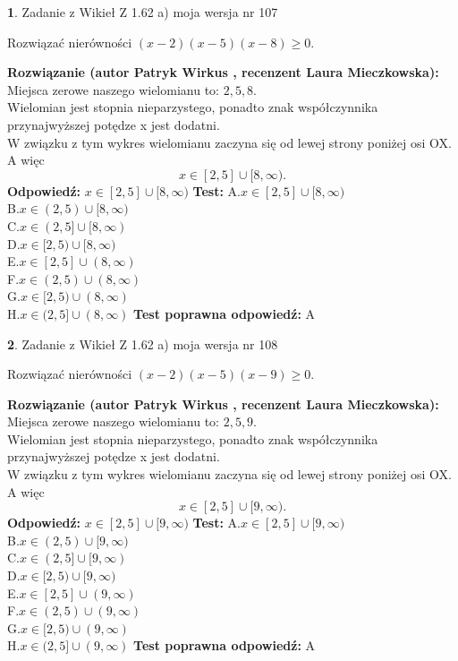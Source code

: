 \documentclass[12pt, a4paper]{article}
\theoremstyle{definition} %
\newtheorem{zad}{}
\newcommand{\zadStart}[1]{\begin{zad}#1\newline}
\newcommand{\zadStop}{\end{zad}}
\newcommand{\rozwStart}[2]{\noindent \textbf{Rozwiązanie (autor #1 , recenzent #2): }\newline}
\newcommand{\rozwStop}{\newline}
\newcommand{\odpStart}{\noindent \textbf{Odpowiedź:}\newline}
\newcommand{\odpStop}{\newline}
\newcommand{\testStart}{\noindent \textbf{Test:}\newline}
\newcommand{\testStop}{\newline}
\newcommand{\kluczStart}{\noindent \textbf{Test poprawna odpowiedź:}\newline}
\newcommand{\kluczStop}{\newline}
\begin{document}
\zadStart{Zadanie z Wikieł Z 1.62 a) moja wersja nr 107}

Rozwiązać nierówności $(x-2)(x-5)(x-8)\ge0$.
\zadStop
\rozwStart{Patryk Wirkus}{Laura Mieczkowska}
Miejsca zerowe naszego wielomianu to: $2, 5, 8$.\\
Wielomian jest stopnia nieparzystego, ponadto znak współczynnika przy\linebreak najwyższej potędze x jest dodatni.\\ W związku z tym wykres wielomianu zaczyna się od lewej strony poniżej osi OX. A więc $$x \in [2,5] \cup [8,\infty).$$
\rozwStop
\odpStart
$x \in [2,5] \cup [8,\infty)$
\odpStop
\testStart
A.$x \in [2,5] \cup [8,\infty)$\\
B.$x \in (2,5) \cup [8,\infty)$\\
C.$x \in (2,5] \cup [8,\infty)$\\
D.$x \in [2,5) \cup [8,\infty)$\\
E.$x \in [2,5] \cup (8,\infty)$\\
F.$x \in (2,5) \cup (8,\infty)$\\
G.$x \in [2,5) \cup (8,\infty)$\\
H.$x \in (2,5] \cup (8,\infty)$
\testStop
\kluczStart
A
\kluczStop



\zadStart{Zadanie z Wikieł Z 1.62 a) moja wersja nr 108}

Rozwiązać nierówności $(x-2)(x-5)(x-9)\ge0$.
\zadStop
\rozwStart{Patryk Wirkus}{Laura Mieczkowska}
Miejsca zerowe naszego wielomianu to: $2, 5, 9$.\\
Wielomian jest stopnia nieparzystego, ponadto znak współczynnika przy\linebreak najwyższej potędze x jest dodatni.\\ W związku z tym wykres wielomianu zaczyna się od lewej strony poniżej osi OX. A więc $$x \in [2,5] \cup [9,\infty).$$
\rozwStop
\odpStart
$x \in [2,5] \cup [9,\infty)$
\odpStop
\testStart
A.$x \in [2,5] \cup [9,\infty)$\\
B.$x \in (2,5) \cup [9,\infty)$\\
C.$x \in (2,5] \cup [9,\infty)$\\
D.$x \in [2,5) \cup [9,\infty)$\\
E.$x \in [2,5] \cup (9,\infty)$\\
F.$x \in (2,5) \cup (9,\infty)$\\
G.$x \in [2,5) \cup (9,\infty)$\\
H.$x \in (2,5] \cup (9,\infty)$
\testStop
\kluczStart
A
\kluczStop
\end{document}
